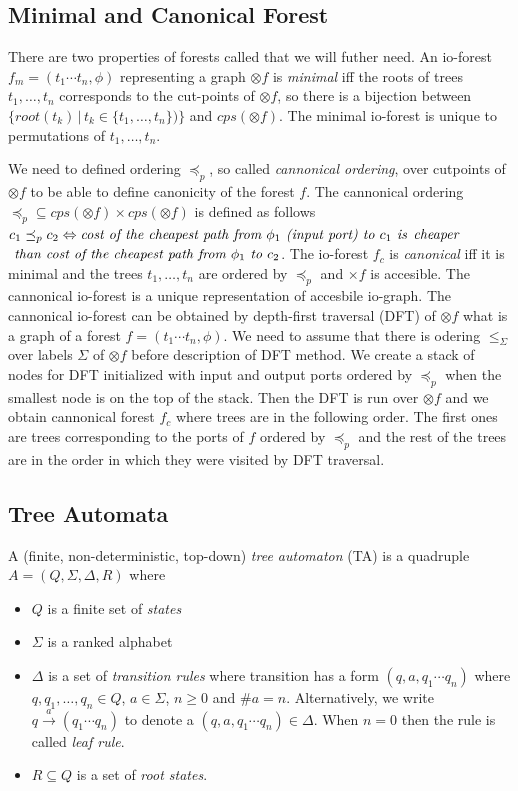 \subsection{Minimal and Canonical Forest}
\label{subsec:mcforest}

There are two properties of forests called that we will futher need.
An io-forest $f_m=(t_1 \cdots t_n, \phi)$ representing a graph $\otimes f$ is \emph{minimal}
iff the roots of trees $t_1,\ldots,t_n$ corresponds to the cut-points of $\otimes f$,
so there is a bijection between $\{root(t_k)\,|\, t_k \in \{t_1, \ldots, t_n\} )\}$ and $cps(\otimes f)$.
The minimal io-forest is unique to permutations of $t_1,\ldots,t_n$.

We need to defined ordering $\preceq_p$, so called \emph{cannonical ordering}, over cutpoints of $\otimes f$ to be able to define canonicity of the forest $f$.
The cannonical ordering $\preceq_p \subseteq cps(\otimes f) \times cps(\otimes f)$ is defined as follows $c_1 \preceq_p c_2 \Leftrightarrow \emph{cost of the cheapest path from }
\phi_1 \emph{ (input port) to } c_1 \emph{ is}$ $\emph{cheaper}$ $\emph{ than cost of the cheapest path from } \phi_1 \emph{ to } c_2$.
The io-forest $f_c$ is \emph{canonical} iff it is minimal and the trees $t_1,\ldots, t_n$ are ordered by $\preceq_p$ and $\times f$ is accesible.
The cannonical io-forest is a unique representation of accesbile io-graph.
The cannonical io-forest can be obtained by depth-first traversal (DFT) of $\otimes f$ what is a graph of a forest $f = (t_1 \cdots t_n, \phi)$.
We need to assume that there is odering $\leq_\Sigma$ over labels $\Sigma$ of $\otimes f$ before description of DFT method.
We create a stack of nodes for DFT initialized with input and output ports ordered by $\preceq_p$ when the smallest node is on the top of the stack.
Then the DFT is run over $\otimes f$ and we obtain cannonical forest $f_c$ where trees are in the following order.
The first ones are trees corresponding to the ports of $f$ ordered by $\preceq_p$ and the rest of the trees are in the order
in which they were visited by DFT traversal.


\subsection{Tree Automata}
\label{subsec:ta}

A (finite, non-deterministic, top-down) \emph{tree automaton} (TA) is a
quadruple $A = (Q, \Sigma, \Delta, R)$ where
\begin{itemize}
	\item $Q$ is a finite set of \emph{states}
	\item $\Sigma$ is a ranked alphabet
	\item $\Delta$ is a set of \emph{transition rules} where transition has a form $(q,a,q_1 \cdots q_n)$ where $q,q_1,\ldots,q_n \in Q$, $a \in \Sigma$, $n \geq 0$ and $\#a = n$.
		Alternatively, we write $q \xrightarrow{a} (q_1 \cdots q_n)$ to denote a $(q,a,q_1 \cdots q_n) \in \Delta$.
		When $n=0$ then the rule is called \emph{leaf rule}.
	\item $R \subseteq Q$ is a set of \emph{root states}.
\end{itemize}

